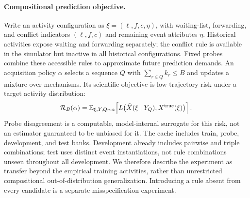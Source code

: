 \paragraph{Compositional prediction objective.}
Write an activity configuration as $\xi=(\ell,f,c,\eta)$, with waiting-list, forwarding, and conflict indicators $(\ell,f,c)$ and remaining event attributes $\eta$. Historical activities expose waiting and forwarding separately; the conflict rule is available in the simulator but inactive in all historical configurations. Fixed probes combine these accessible rules to approximate future prediction demands. An acquisition policy $\alpha$ selects a sequence $Q$ with $\sum_{r\in Q}k_r\leq B$ and updates a mixture over mechanisms. Its scientific objective is low trajectory risk under a target activity distribution:
\begin{equation}
 \mathcal R_B(\alpha)=\mathbb{E}_{\xi,Y,Q\sim\alpha}\!\left[
 L\big(\widehat X(\xi\mid Y_Q),X^{\mathrm{true}}(\xi)\big)\right].
 \label{eq:risk}
\end{equation}
Probe disagreement is a computable, model-internal surrogate for this risk, not an estimator guaranteed to be unbiased for it. The cache includes train, probe, development, and test banks. Development already includes pairwise and triple combinations; test uses distinct event instantiations, not rule combinations unseen throughout all development. We therefore describe the experiment as transfer beyond the empirical training activities, rather than unrestricted compositional out-of-distribution generalization. Introducing a rule absent from every candidate is a separate misspecification experiment.
